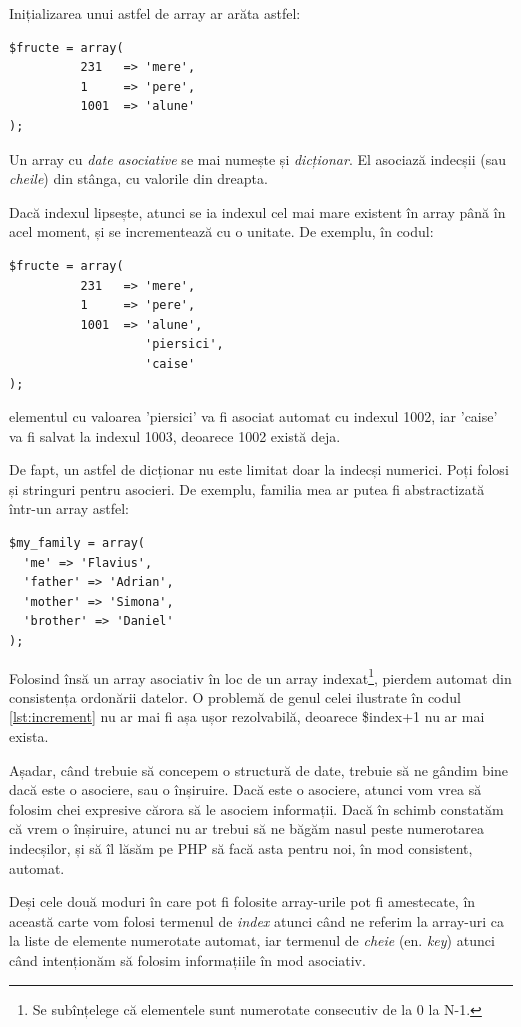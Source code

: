 Inițializarea unui astfel de array ar arăta astfel:
\begin{lstlisting}
$fructe = array(
		  231	=> 'mere',
		  1		=> 'pere',
		  1001	=> 'alune'
);
\end{lstlisting}
Un array cu \textsl{date asociative} se mai numește și \textsl{dicționar}. El asociază
indecșii (sau \textsl{cheile}) din stânga, cu valorile din dreapta.


Dacă indexul lipsește, atunci se ia indexul cel mai mare
existent în array până în acel moment, și se incrementează cu o unitate.
De exemplu, în codul:
\begin{lstlisting}
$fructe = array(
		  231	=> 'mere',
		  1		=> 'pere',
		  1001	=> 'alune',
				   'piersici',
				   'caise'
);
\end{lstlisting}
elementul cu valoarea 'piersici' va fi asociat automat cu indexul 1002, iar 'caise'
va fi salvat la indexul 1003, deoarece 1002 există deja.

De fapt, un astfel de dicționar nu este limitat doar la indecși numerici.
Poți folosi și stringuri pentru asocieri. De exemplu, familia mea
ar putea fi abstractizată într-un array astfel:

\begin{lstlisting}
$my_family = array(
  'me' => 'Flavius',
  'father' => 'Adrian',
  'mother' => 'Simona',
  'brother' => 'Daniel'
);
\end{lstlisting}

Folosind însă un array asociativ în loc de un array indexat\footnote{Se subînțelege
că elementele sunt numerotate consecutiv de la 0 la N-1.}, pierdem automat
din consistența ordonării datelor. O problemă de genul celei ilustrate în
codul \ref{lst:increment} nu ar mai fi așa ușor rezolvabilă, deoarece {\glqq}\$index+1{\grqq}
nu ar mai exista.

Așadar, când trebuie să concepem o structură de date, trebuie să ne gândim
bine dacă este o asociere, sau o înșiruire. Dacă este o asociere, atunci
vom vrea să folosim chei expresive cărora să le asociem informații. Dacă
în schimb constatăm că vrem o înșiruire, atunci nu ar trebui să
ne băgăm nasul peste numerotarea indecșilor, și să îl lăsăm pe PHP
să facă asta pentru noi, în mod consistent, automat.

Deși cele două moduri în care pot fi folosite array-urile pot fi amestecate,
în această carte vom folosi termenul de \textsl{index} atunci când ne referim la
array-uri ca la liste de elemente numerotate automat, iar termenul de \textsl{cheie} (en. \textsl{key})
atunci când intenționăm să folosim informațiile în mod asociativ.

